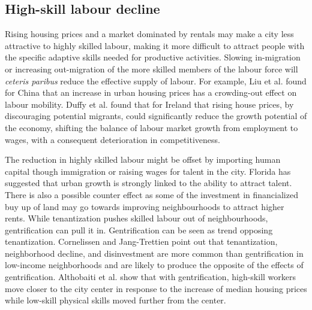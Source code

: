 \subsection{High-skill labour decline}
Rising housing prices and a market dominated by rentals may make a city less attractive to highly skilled labour, making it more difficult to attract people with the specific adaptive skills needed for productive activities. %
Slowing in-migration or increasing out-migration of the more skilled members of the labour force will \textit{ceteris paribus} reduce the effective supply of labour. 
For example, Liu et al. \cite{liuImpactUrbanHousing2023} found for China that an increase in urban housing prices has a crowding-out effect on labour mobility.  Duffy et al.  \cite{duffyRisingHousePrices2005} found that for Ireland that rising house prices, by discouraging potential migrants, could significantly reduce the growth potential of the economy, shifting the balance of labour market growth from employment to wages, with a consequent deterioration in competitiveness. %

The reduction in highly skilled labour might be offset by importing human capital though immigration or raising wages for talent in the city. Florida\cite{floridaCompetingAgeTalent2005, floridaCreativeClassEconomic2014} has suggested that urban growth is strongly linked to the ability to attract talent. 
There is also a possible counter effect as some of the investment in financialized buy up of land may go towards improving neighbourhoods to attract higher rents.  
While \gls{tenantization} pushes skilled labour out of neighbourhoods, \gls{gentrification} can pull it in. Gentrification can be seen as trend opposing tenantization. Cornelissen and Jang-Trettien \cite{cornelissenHousingContextNeighborhood2023} point out that tenantization, neighborhood decline, and disinvestment are more common than gentrification in low-income neighborhoods and are likely to produce the opposite of the effects of gentrification. Althobaiti et al. \cite{althobaitiHousingPricesSkills2021a} %
show that with gentrification, high-skill workers %
move closer to the city center in response to the increase of median housing prices while low-skill physical skills moved further from the center.  

